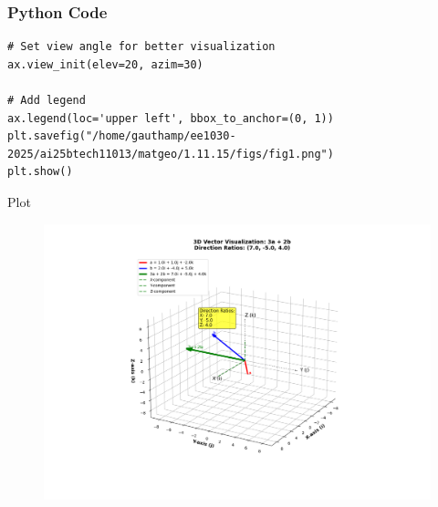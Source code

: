 \documentclass{beamer}
\begin{document}
\begin{frame}[fragile]
\frametitle{Python Code}
   \begin{lstlisting}
# Set view angle for better visualization
ax.view_init(elev=20, azim=30)

# Add legend
ax.legend(loc='upper left', bbox_to_anchor=(0, 1))
plt.savefig("/home/gauthamp/ee1030-2025/ai25btech11013/matgeo/1.11.15/figs/fig1.png")
plt.show()
\end{lstlisting}
\end{frame}
\begin{frame}{Plot}
    \begin{figure}[h!]
    \centering
    \includegraphics[height=1\textheight, keepaspectratio]{figs/fig1.png}
    \label{figure_1}
\end{figure}
\end{frame}
\end{document}
